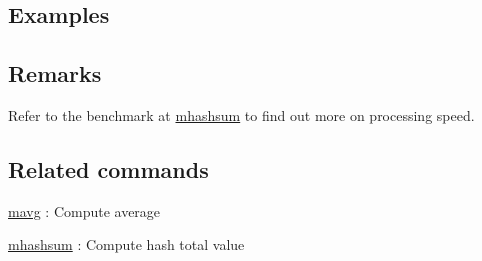 \subsection*{Examples}


\subsection*{Remarks}
Refer to the benchmark at \hyperref[sect:mhashsum]{mhashsum} to find out more on processing speed. 

\subsection*{Related commands}
\hyperref[sect:mavg] {mavg} : Compute average

\hyperref[sect:mhashsum]{mhashsum} : Compute hash total value


%
